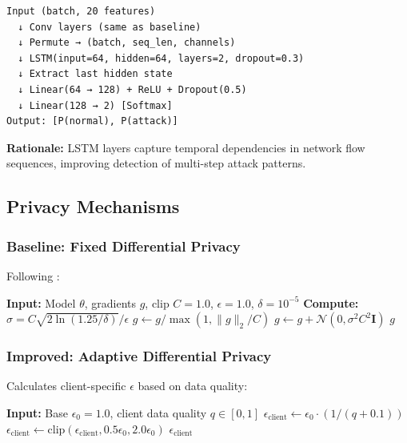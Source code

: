 \begin{verbatim}
Input (batch, 20 features)
  ↓ Conv layers (same as baseline)
  ↓ Permute → (batch, seq_len, channels)
  ↓ LSTM(input=64, hidden=64, layers=2, dropout=0.3)
  ↓ Extract last hidden state
  ↓ Linear(64 → 128) + ReLU + Dropout(0.5)
  ↓ Linear(128 → 2) [Softmax]
Output: [P(normal), P(attack)]
\end{verbatim}

\textbf{Rationale:} LSTM layers capture temporal dependencies in network flow sequences, improving detection of multi-step attack patterns.

\subsection{Privacy Mechanisms}

\subsubsection{Baseline: Fixed Differential Privacy}

Following \citet{saklani2026privacy}:

\begin{algorithm}
\caption{Fixed DP-SGD}
\begin{algorithmic}
\STATE \textbf{Input:} Model $\theta$, gradients $g$, clip $C=1.0$, $\epsilon=1.0$, $\delta=10^{-5}$
\STATE \textbf{Compute:} $\sigma = C \sqrt{2\ln(1.25/\delta)} / \epsilon$
\STATE $g \leftarrow g / \max(1, \|g\|_2 / C)$ 
\STATE $g \leftarrow g + \mathcal{N}(0, \sigma^2 C^2 \mathbf{I})$ 
\RETURN $g$
\end{algorithmic}
\end{algorithm}

\subsubsection{Improved: Adaptive Differential Privacy}

Calculates client-specific $\epsilon$ based on data quality:

\begin{algorithm}
\caption{Adaptive Privacy Budget}
\begin{algorithmic}
\STATE \textbf{Input:} Base $\epsilon_0=1.0$, client data quality $q \in [0,1]$
\STATE $\epsilon_{\text{client}} \leftarrow \epsilon_0 \cdot (1 / (q + 0.1))$
\STATE $\epsilon_{\text{client}} \leftarrow \text{clip}(\epsilon_{\text{client}}, 0.5\epsilon_0, 2.0\epsilon_0)$
\RETURN $\epsilon_{\text{client}}$
\end{algorithmic}
\end{algorithm}


